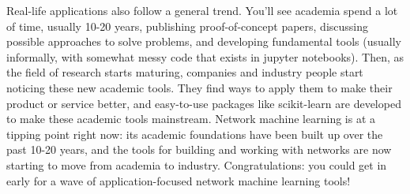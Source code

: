 Real-life applications also follow a general trend. You'll see academia spend a lot of time, usually 10-20 years, publishing proof-of-concept papers, discussing possible approaches to solve problems, and developing fundamental tools (usually informally, with somewhat messy code that exists in jupyter notebooks). Then, as the field of research starts maturing, companies and industry people start noticing these new academic tools. They find ways to apply them to make their product or service better, and easy-to-use packages like scikit-learn are developed to make these academic tools mainstream. Network machine learning is at a tipping point right now: its academic foundations have been built up over the past 10-20 years, and the tools for building and working with networks are now starting to move from academia to industry. Congratulations: you could get in early for a wave of application-focused network machine learning tools!
